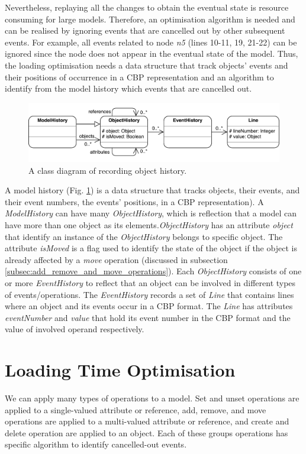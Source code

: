 \documentclass{llncs}
\begin{document}
Nevertheless, replaying all the changes to obtain the eventual state is resource consuming for large models. Therefore, an optimisation algorithm is needed and can be realised by ignoring events that are cancelled out by other subsequent events. For example, all events related to node \emph{n5} (lines 10-11, 19, 21-22) can be ignored since the node does not appear in the eventual state of the model. Thus, the loading optimisation needs a data structure that track objects' events and their positions of occurrence in a CBP representation and an algorithm to identify from the model history which events that are cancelled out.

\begin{figure}[ht]
\centering
\includegraphics[width=\linewidth]{object_history}
\caption{A class diagram of recording object history.}
\label{fig:object_history}
\end{figure}

A model history (Fig. \ref{fig:object_history}) is a data structure that tracks objects, their events, and their event numbers, the events' positions, in a CBP representation). A \emph{ModelHistory} can have many \emph{ObjectHistory}, which is reflection that a model can have more than one object as its elements.\emph{ObjectHistory} has an attribute \emph{object} that identify an instance of the \emph{ObjectHistory} belongs to specific object. The attribute \emph{isMoved} is a flag used to identify the state of the object if the object is already affected by a \emph{move} operation (discussed in subsection \ref{subsec:add_remove_and_move_operations}). Each \emph{ObjectHistory} consists of one or more \emph{EventHistory} to reflect that an object can be involved in different types of events/operations. The \emph{EventHistory} records a set of \emph{Line} that contains lines where an object and its events occur in a CBP format. The \emph{Line} has attributes \emph{eventNumber} and \emph{value} that hold its event number in the CBP format and the value of involved operand respectively. 

\section{Loading Time Optimisation}
\label{sec:loading_time_optimisation}
We can apply many types of operations to a model. Set and unset operations are applied to a single-valued attribute or reference, add, remove, and move operations are applied to a multi-valued attribute or reference, and create and delete operation are applied to an object. Each of these groups operations has specific algorithm to identify cancelled-out events. 
\end{document}
